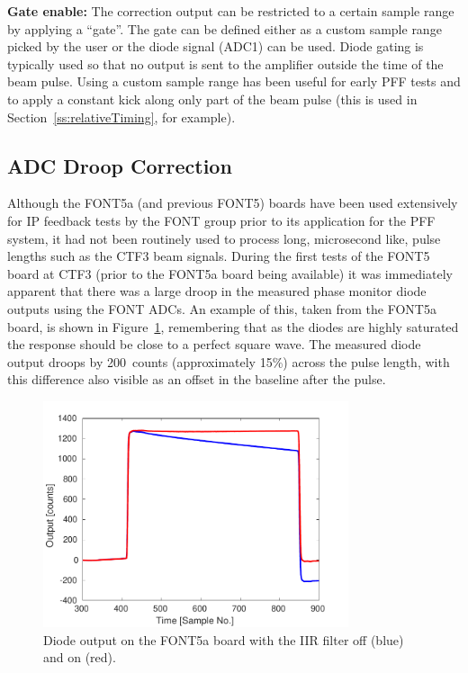 \textbf{Gate enable:} The correction output can be restricted to a certain sample range by applying a ``gate''. The gate can be defined either as a custom sample range picked by the user or the diode signal (ADC1) can be used. Diode gating is typically used so that no output is sent to the amplifier outside the time of the beam pulse. Using a custom sample range has been useful for early PFF tests and to apply a constant kick along only part of the beam pulse (this is used in Section~\ref{ss:relativeTiming}, for example).


\subsection{ADC Droop Correction}
\label{ss:droopCorr}

Although the FONT5a (and previous FONT5) boards have been used extensively for IP feedback tests by the FONT group prior to its application for the PFF system, it had not been routinely used to process long, microsecond like, pulse lengths such as the CTF3 beam signals. During the first tests of the FONT5 board at CTF3 (prior to the FONT5a board being available) it was immediately apparent that there was a large droop in the measured phase monitor diode outputs using the FONT ADCs. An example of this, taken from the FONT5a board, is shown in Figure~\ref{f:iirDiodefiltOffOn}, remembering that as the diodes are highly saturated the response should be close to a perfect square wave. The measured diode output droops by 200~counts (approximately 15\%) across the pulse length, with this difference also visible as an offset in the baseline after the pulse.

\begin{figure}
  \centering
  \includegraphics[width=0.8\textwidth]{Figures/commissioning/iirDiodeFiltOffOn}
  \caption{Diode output on the FONT5a board with the IIR filter off (blue) and on (red).}
  \label{f:iirDiodefiltOffOn}
\end{figure}

